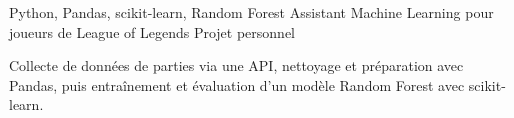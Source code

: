 
\begin{cventries}
  \cventry
    {Python, Pandas, scikit-learn, Random Forest}
    {Assistant Machine Learning pour joueurs de League of Legends}
    {Projet personnel}
    {}
    {
      \begin{cvitems}
        \item {Collecte de données de parties via une API, nettoyage et préparation avec Pandas, puis entraînement et évaluation d’un modèle Random Forest avec scikit-learn.}
      \end{cvitems}
    }
\end{cventries}
